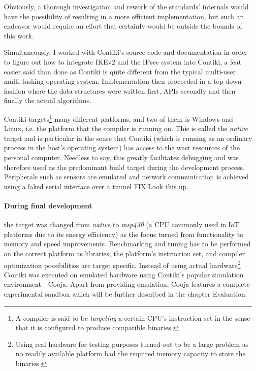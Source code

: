 \documentclass[final,a4paper,twoside,11pt,onecolumn]{report}
\begin{document}
Obviously, a thorough investigation and rework of the standards' internals would have the possibility of resulting in a more efficient implementation, but such an endeavor would require an effort that certainly would be outside the bounds of this work. 

Simultaneously, I worked with Contiki's source code and documentation in order to figure out how to integrate IKEv2 and the IPsec system into Contiki, a feat easier said than done as Contiki is quite different from the typical multi-user multi-tasking operating system. Implementation then proceeded in a top-down fashion where the data structures were written first, APIs secondly and then finally the actual algorithms.

Contiki targets\footnote{A compiler is said to be \emph{targeting} a certain CPU's instruction set in the sense that it is configured to produce compatible binaries.} many different platforms, and two of them is Windows and Linux, i.e. the platform that the compiler is running on. This is called the \emph{native} target and is particular in the sense that Contiki (which is running as an ordinary process in the host's operating system) has access to the wast resources of the personal computer. Needless to say, this greatly facilitates debugging and was therefore used as the predominant build target during the development process. Peripherals such as sensors are emulated and network communication is achieved using a faked serial interface over a tunnel FIX:Look this up. 

\paragraph{During final development} the target was changed from \emph{native} to \emph{msp430} (a CPU commonly used in IoT platforms due to its energy efficiency) as the focus turned from functionality to memory and speed improvements. Benchmarking and tuning has to be performed on the correct platform as libraries, the platform's instruction set, and compiler optimization possibilities are target specific. Instead of using actual hardware\footnote{Using real hardware for testing purposes turned out to be a large problem as no readily available platform had the required memory capacity to store the binaries.} Contiki was executed on emulated hardware using Contiki's popular simulation environment - Cooja\cite{osterlind06crosslevel}. Apart from providing emulation, Cooja features a complete experimental sandbox which will be further described in the chapter Evaluation.
\end{document}
